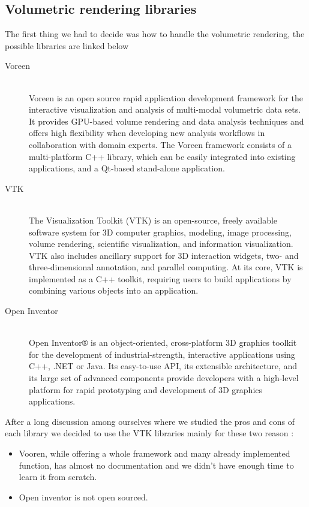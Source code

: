 \documentclass[11pt]{article} %
\begin{document}
\subsection{Volumetric rendering libraries}
The first thing we had to decide was how to handle the volumetric rendering, the possible libraries are linked below

\begin{description}

\item[Voreen]\hfill \\ 
 Voreen is an open source rapid application development framework for the interactive visualization and analysis of multi-modal volumetric data sets. It provides GPU-based volume rendering and data analysis techniques and offers high flexibility when developing new analysis workflows in collaboration with domain experts. The Voreen framework consists of a multi-platform C++ library, which can be easily integrated into existing applications, and a Qt-based stand-alone application.
 \item[VTK] \hfill \\
The Visualization Toolkit (VTK) is an open-source, freely available software system for 3D computer graphics, modeling, image processing, volume rendering, scientific visualization, and information visualization. VTK also includes ancillary support for 3D interaction widgets, two- and three-dimensional annotation, and parallel computing. At its core, VTK is implemented as a C++ toolkit, requiring users to build applications by combining various objects into an application. 
 \item[Open Inventor] \hfill \\
Open Inventor® is an object-oriented, cross-platform 3D graphics toolkit for the development of industrial-strength, interactive applications using C++, .NET or Java.
Its easy-to-use API, its extensible architecture, and its large set of advanced components provide developers with a high-level platform for rapid prototyping and development of 3D graphics applications.

\end{description}

\noindent
After a long discussion among ourselves where we studied the pros and cons of each library we decided to use the VTK libraries mainly for these two reason :
\begin{itemize}
\item Vooren, while offering a whole framework and many already implemented function, has almost no documentation and we didn't have enough time to learn it from scratch. %
\item Open inventor is not open sourced. 
\end{itemize}
\end{document}
